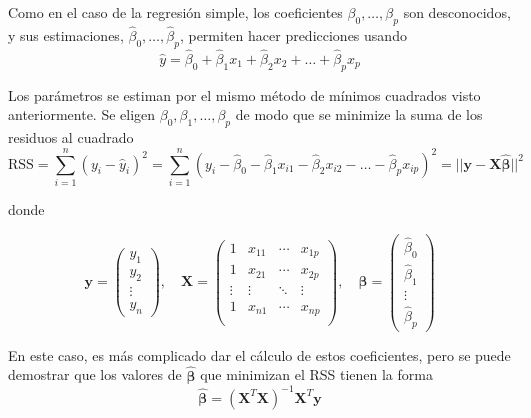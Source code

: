 Como en el caso de la regresión simple, los coeficientes $\beta_0, \dots, \beta_p$ son desconocidos, y sus estimaciones, $\hat{\beta}_0, \dots, \hat{\beta}_p$, permiten hacer predicciones usando 
\begin{equation}
\hat{y} = \hat{\beta}_0 + \hat{\beta}_1 x_1 + \hat{\beta}_2 x_2 + \dots + \hat{\beta}_p x_p
\label{eq:3.21}
\end{equation}

Los parámetros se estiman por el mismo método de mínimos cuadrados visto anteriormente. Se eligen $\beta_0, \beta_1, \dots, \beta_p$ de modo que se minimize la suma de los residuos al cuadrado
\begin{equation}
\text{RSS} = \sum_{i=1}^n (y_i - \hat{y}_i)^2 = \sum_{i=1}^n (y_i - \hat{\beta}_0 - \hat{\beta}_1 x_{i1} - \hat{\beta}_2 x_{i2} - \dots - \hat{\beta}_p x_{ip})^2 = ||\mathbf{y} - \mathbf{X}\boldsymbol{\hat{\beta}}||^2
\end{equation}

\noindent donde 

\begin{equation}
\mathbf{y} = 
\begin{pmatrix}
y_1 \\
y_2 \\
\vdots \\
y_n
\end{pmatrix}, \quad \mathbf{X} = 
\begin{pmatrix}
1 & x_{11} & \cdots & x_{1p} \\
1 & x_{21} & \cdots & x_{2p} \\
\vdots & \vdots & \ddots & \vdots \\
1 & x_{n1} & \cdots & x_{np} \\
\end{pmatrix}, \quad \boldsymbol{\hat{\beta}} = 
\begin{pmatrix}
\hat{\beta}_0 \\
\hat{\beta}_1 \\
\vdots \\
\hat{\beta}_p
\end{pmatrix}
\end{equation}

En este caso, es más complicado dar el cálculo de estos coeficientes, pero se puede demostrar que los valores de $\boldsymbol{\hat{\beta}}$ que minimizan el RSS tienen la forma 
\begin{equation}
\boldsymbol{\hat{\beta}} = (\mathbf{X}^T\mathbf{X})^{-1} \mathbf{X}^T \mathbf{y}
\end{equation}


